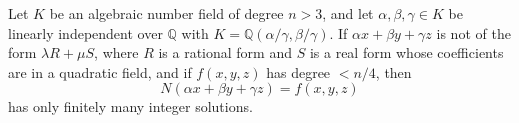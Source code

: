 \begin{proposition}
    Let $K$ be an algebraic number field of degree $n>3$, and let $\alpha,\beta,\gamma\in K$ be linearly independent over $\mathbb{Q}$ with $K=\mathbb{Q}(\alpha/\gamma,\beta/\gamma)$. If $\alpha x+\beta y+\gamma z$ is not of the form $\lambda R+\mu S$, where $R$ is a rational form and $S$ is a real form whose coefficients are in a quadratic field, and if $f(x,y,z)$ has degree $<n/4$, then
\[
    N(\alpha x+\beta y+\gamma z)=f(x,y,z)
\]
    has only finitely many integer solutions.
\end{proposition}
